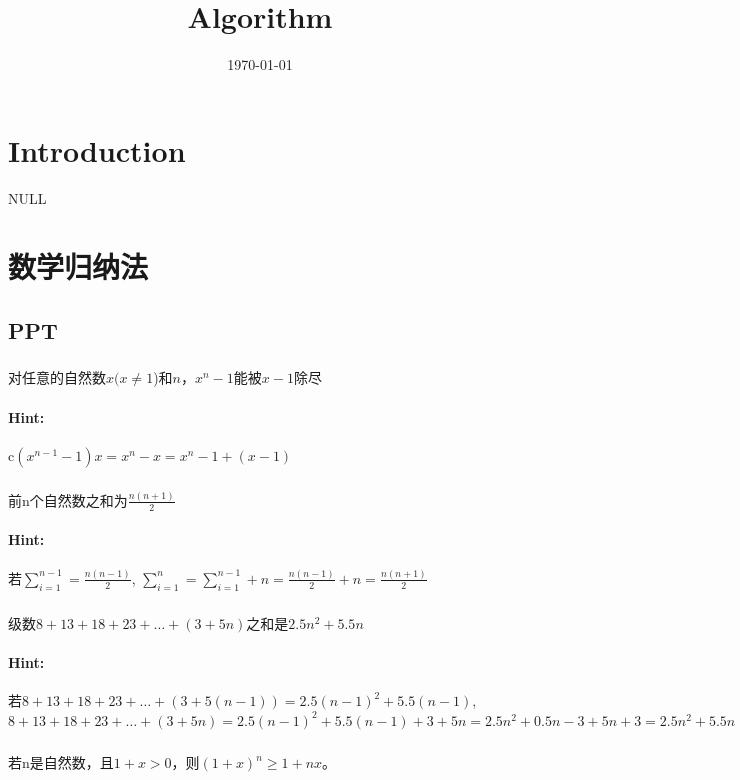 \documentclass{article}
\title{Algorithm}
\date{\today}
\begin{document}
 


\maketitle

\section{Introduction}
    NULL

\section{数学归纳法} 
\subsection{PPT}
    \subsubsection{}对任意的自然数$x(x \ne 1$)和$n$，$x^{n}
-1$能被$x-1$除尽
    \paragraph{Hint:} c$(x^{n-1}-1)x = x^{n} - x = x^{n} - 1 + (x - 1) $

    \subsubsection{}前n个自然数之和为$\frac{n(n+1)}{2}$
    \paragraph{Hint:} 若$\sum_{i=1}^{n-1} = \frac{n(n-1)}{2}$, $\sum_{i=1}^{n} =\sum_{i=1}^{n-1} + n = \frac{n(n-1)}{2} + n = \frac{n(n+1)}{2}$
    
    \subsubsection{}级数$8+13+18+23+…+(3+5n)$之和是$2.5n^{2}+5.5n$
    \paragraph{Hint:} 若$8+13+18+23+…+(3+5(n-1)) = 2.5(n-1)^{2}+5.5(n-1)$,$8+13+18+23+…+(3+5n) = 2.5(n-1)^{2}+5.5(n-1) + 3+5n = 2.5n^{2}+ 0.5n -3 + 5n +3 = 2.5n^{2}+5.5n $
    
    \subsubsection{}若n是自然数，且$1+x>0$，则$(1+x)^{n}\geq 1+nx $。
\end{document}
